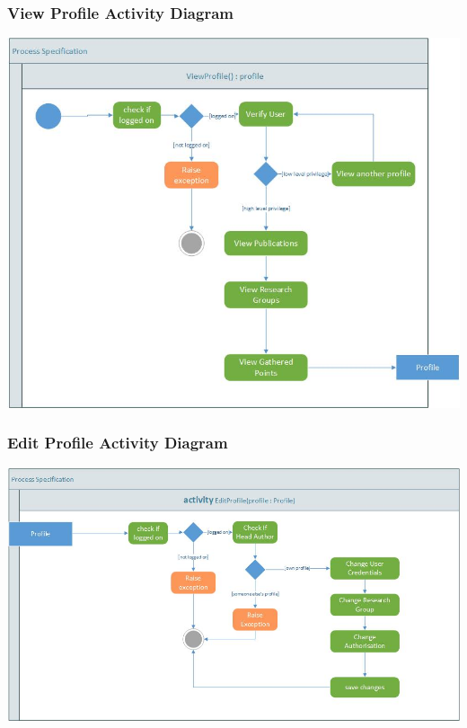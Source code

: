 \documentclass[a4paper,12pt]{article}
\begin{document}
	\subsubsection{View Profile Activity Diagram}
	\includegraphics[width=1\textwidth]{./actvity_view_profile.jpg}\\[1.5cm]
	
	\subsubsection{Edit Profile Activity  Diagram}
	\includegraphics[width=1\textwidth]{./activity_edit_profile.jpg}\\[1.5cm]
	
\end{document}
